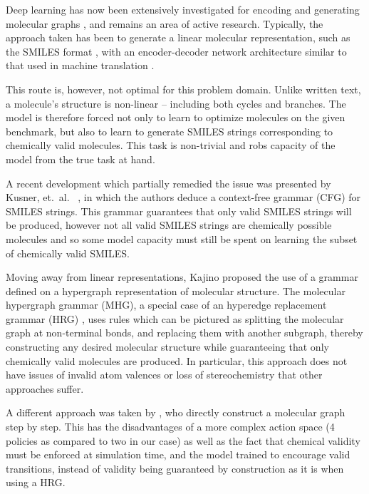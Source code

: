 \documentclass{article}
\begin{document}
Deep learning has now been extensively investigated for encoding and generating molecular graphs \cite{duvenaud2015, kearnes2016, gilmer2017, dai2018, jin2018, simonovsky2018, kusner2017, gomezbombarelli2016, guimaraes2017, pogany2019}, and remains an area of active research. Typically, the approach taken has been to generate a linear molecular representation, such as the SMILES format \cite{weininger1988}, with an encoder-decoder network architecture similar to that used in machine translation \cite{gomezbombarelli2016}.

This route is, however, not optimal for this problem domain. Unlike written text, a molecule's structure is non-linear -- including both cycles and branches. The model is therefore forced not only to learn to optimize molecules on the given benchmark, but also to learn to generate SMILES strings corresponding to chemically valid molecules. This task is non-trivial and robs capacity of the model from the true task at hand.

A recent development which partially remedied the issue was presented by Kusner, et.~al.~ \cite{kusner2017}, in which the authors deduce a context-free grammar (CFG) for SMILES strings. This grammar guarantees that only valid SMILES strings will be produced, however not all valid SMILES strings are chemically possible molecules and so some model capacity must still be spent on learning the subset of chemically valid SMILES.

Moving away from linear representations, Kajino \cite{kajino2018} proposed the use of a grammar defined on a hypergraph representation of molecular structure. The molecular hypergraph grammar (MHG), a special case of an hyperedge replacement grammar (HRG) \cite{drewes1997}, uses rules which can be pictured as splitting the molecular graph at non-terminal bonds, and replacing them with another subgraph, thereby constructing any desired molecular structure while guaranteeing that only chemically valid molecules are produced. In particular, this approach does not have issues of invalid atom valences or loss of stereochemistry that other approaches suffer.

A different approach was taken by \cite{you2018}, who directly construct a molecular graph step by step. This has the disadvantages of a more complex action space (4 policies as compared to two in our case) as well as the fact that chemical validity must be enforced at simulation time, and the model trained to encourage valid transitions, instead of validity being guaranteed by construction as it is when using a HRG.
\end{document}
